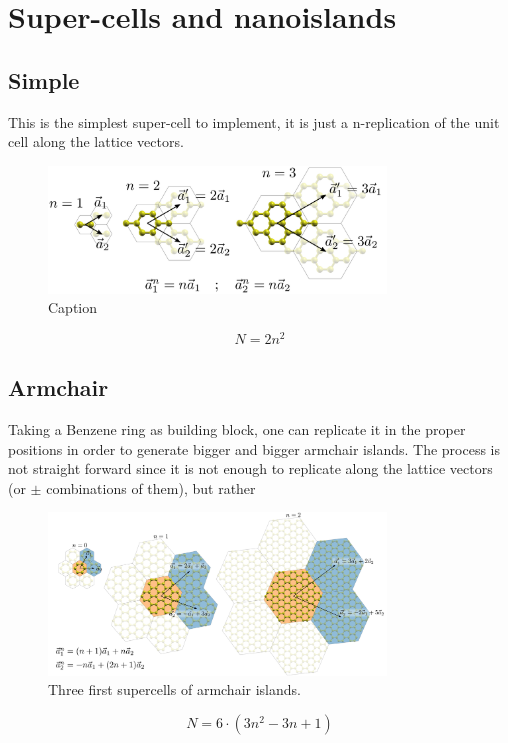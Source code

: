 \chapter{Super-cells and nanoislands}
\section{Simple}
This is the simplest super-cell to implement, it is just a n-replication of the unit cell along the lattice vectors.
\begin{figure}[h!]
\centering
   \includegraphics[width=0.8\textwidth]{appendix/figures/cells_simple.pdf}
\vspace{-5pt}
\caption{Caption}
\label{simple_islands}
\end{figure}
\FloatBarrier
\begin{equation}
   N = 2n^2
\end{equation}


\section{Armchair}
Taking a Benzene ring as building block, one can replicate it in the proper positions in order to generate bigger and bigger armchair islands. The process is not straight forward since it is not enough to replicate along the lattice vectors (or $\pm$ combinations of them), but rather 
\begin{figure}[h!]
\centering
   \includegraphics[width=0.8\textwidth]{appendix/figures/cells_ac.pdf}
\vspace{-5pt}
\caption{Three first supercells of armchair islands.}
\label{ac_islands}
\end{figure}
\FloatBarrier
\begin{equation}
   N = 6\cdot(3n^2-3n+1)
\end{equation}

